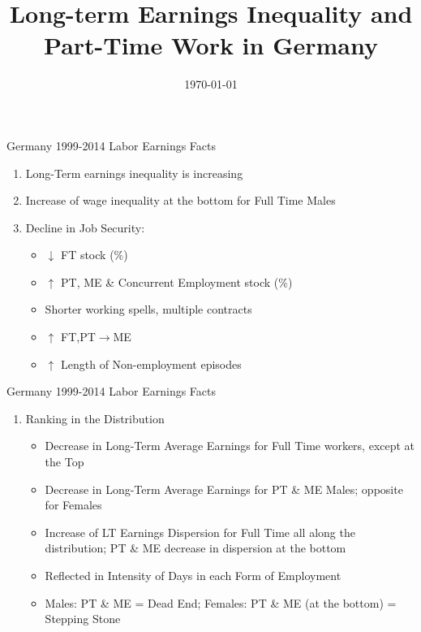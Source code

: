 \documentclass[hyperref={bookmarks=false}]{beamer}
\title{Long-term Earnings Inequality and Part-Time Work in Germany}
\author[Short Name (U ABC)]{%
  \texorpdfstring{%
    \begin{columns}
      \column{.5\linewidth}
      \centering
Manuel Sanchez
    \end{columns}
 }
{Author 1}
}
\institute{University of Bristol}
\date{\today}
\newcounter{ResumeEnumerate}
\begin{document}
\begin{frame}
  \titlepage
\end{frame}


\begin{frame}{Germany 1999-2014 Labor Earnings Facts}\label{DATA}
\begin{enumerate}
\setlength{\itemsep}{0.5 cm}
\item Long-Term earnings inequality is increasing \hyperlink{LTEI}{}
\item Increase of wage inequality at the bottom for Full Time Males \hyperlink{WINEQ}{}
\item Decline in Job Security:
\vfill
\begin{itemize}
\item $\downarrow$ FT stock (\%)
\vfill
\item $\uparrow$ PT, ME \& Concurrent Employment stock (\%) \hyperlink{WFLOW}{}
\vfill
\item Shorter working spells, multiple contracts \hyperlink{SES}{}
\vfill
\item $\uparrow$ FT,PT$\rightarrow$ME \hyperlink{LTEIF}{}
\vfill
\item $\uparrow$ Length of Non-employment episodes \hyperlink{NONEMP}{}
\end{itemize}
\end{enumerate}
\setcounter{ResumeEnumerate}{\value{enumi}}
\end{frame}

\begin{frame}{Germany 1999-2014 Labor Earnings Facts}\label{DATA2}
\begin{enumerate}[start=\numexpr\value{ResumeEnumerate}+1]
\item Ranking in the Distribution \hyperlink{RANK}{}
\begin{itemize}
\vfill
\item Decrease in Long-Term Average Earnings for Full Time workers, except at the Top
\vfill
\item Decrease in Long-Term Average Earnings for PT \& ME Males; opposite for Females
\vfill 
\item Increase of LT Earnings Dispersion for Full Time all along the distribution; PT \& ME decrease in dispersion at the bottom 
\vfill
\item Reflected in Intensity of Days in each Form of Employment
\vfill
\item Males: PT \& ME  = Dead End; Females: PT \& ME (at the bottom) = Stepping Stone
\end{itemize}
\setcounter{ResumeEnumerate}{\value{enumi}}
\end{enumerate}
\end{frame}
\end{document}
